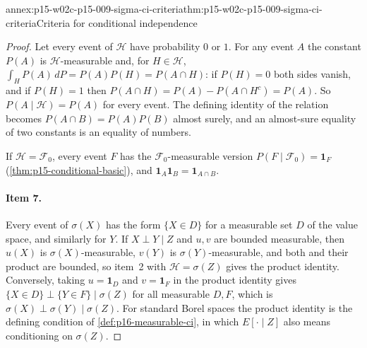 \begin{annexitem}{annex:p15-w02c-p15-009-sigma-ci-criteria}{thm:p15-w02c-p15-009-sigma-ci-criteria}{Criteria for conditional independence}
\begin{proof}
Let every event of \(\mathcal H\) have probability \(0\) or \(1\). For any
event \(A\) the constant \(P(A)\) is \(\mathcal H\)-measurable and, for
\(H\in\mathcal H\), \(\int_HP(A)\,dP=P(A)P(H)=P(A\cap H)\): if \(P(H)=0\)
both sides vanish, and if \(P(H)=1\) then
\(P(A\cap H)=P(A)-P(A\cap H^c)=P(A)\). So \(P(A\mid\mathcal H)=P(A)\) for
every event. The defining identity of the relation becomes
\(P(A\cap B)=P(A)P(B)\) almost surely, and an almost-sure equality of two
constants is an equality of numbers.

If \(\mathcal H=\mathcal F_0\), every event \(F\) has the
\(\mathcal F_0\)-measurable version \(P(F\mid\mathcal F_0)=\mathbf1_F\)
(\cref{thm:p15-conditional-basic}), and
\(\mathbf1_A\mathbf1_B=\mathbf1_{A\cap B}\).

\paragraph{Item 7.} Every event of \(\sigma(X)\) has the form
\(\{X\in D\}\) for a measurable set \(D\) of the value space, and similarly
for \(Y\). If \(X\perp Y\mid Z\) and \(u,v\) are bounded measurable, then
\(u(X)\) is \(\sigma(X)\)-measurable, \(v(Y)\) is \(\sigma(Y)\)-measurable,
and both and their product are bounded, so item~2 with
\(\mathcal H=\sigma(Z)\) gives the product identity. Conversely, taking
\(u=\mathbf1_D\) and \(v=\mathbf1_F\) in the product identity gives
\(\{X\in D\}\perp\{Y\in F\}\mid\sigma(Z)\) for all measurable \(D,F\), which
is \(\sigma(X)\perp\sigma(Y)\mid\sigma(Z)\). For standard Borel spaces the
product identity is the defining condition of \cref{def:p16-measurable-ci},
in which \(E[\cdot\mid Z]\) also means conditioning on \(\sigma(Z)\).
\end{proof}
\end{annexitem}

